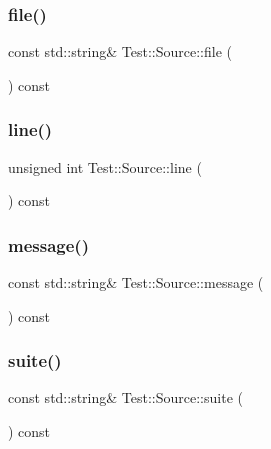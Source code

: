 \subsubsection{\texorpdfstring{file()}{file()}}
{\footnotesize\ttfamily const std\+::string\& Test\+::\+Source\+::file (\begin{DoxyParamCaption}{ }\end{DoxyParamCaption}) const}

\mbox{\label{class_test_1_1_source_ae3da8b65a4a950a4be76bae056dbb5ee}} 
\subsubsection{\texorpdfstring{line()}{line()}}
{\footnotesize\ttfamily unsigned int Test\+::\+Source\+::line (\begin{DoxyParamCaption}{ }\end{DoxyParamCaption}) const}

\mbox{\label{class_test_1_1_source_add142dd87973b9b16dfad92ba1efbe9c}} 
\subsubsection{\texorpdfstring{message()}{message()}}
{\footnotesize\ttfamily const std\+::string\& Test\+::\+Source\+::message (\begin{DoxyParamCaption}{ }\end{DoxyParamCaption}) const}

\mbox{\label{class_test_1_1_source_afb6c58ea7325e7082539f4e1cefc4508}} 
\subsubsection{\texorpdfstring{suite()}{suite()}}
{\footnotesize\ttfamily const std\+::string\& Test\+::\+Source\+::suite (\begin{DoxyParamCaption}{ }\end{DoxyParamCaption}) const}

